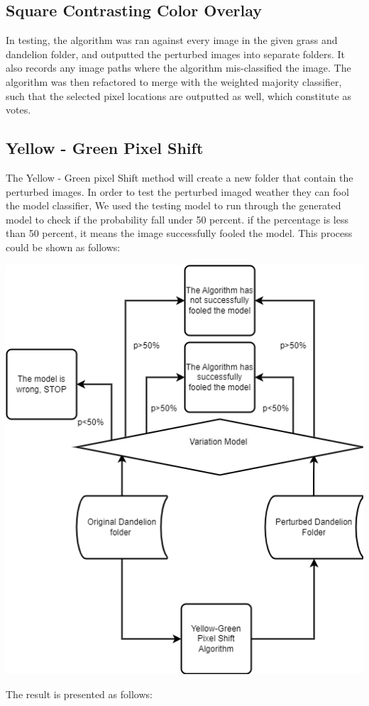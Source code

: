 \documentclass{article}
\begin{document}
\subsection{Square Contrasting Color Overlay}
In testing, the algorithm was ran against every image in the given grass and dandelion folder, and outputted the perturbed images into separate folders. It also records any image paths where the algorithm mis-classified the image. The algorithm was then refactored to merge with the weighted majority classifier, such that the selected pixel locations are outputted as well, which constitute as votes.

\subsection{Yellow - Green Pixel Shift}
\vspace{0.1in}
The Yellow - Green pixel Shift method will create a new folder that contain the perturbed images. In order to test the perturbed imaged weather they can fool the model classifier, We used the testing model to run through the generated model to check if the probability fall under 50 percent. if the percentage is less than 50 percent, it means the image successfully fooled the model. This process could be shown as follows:
\begin{center}
\includegraphics[scale = 0.5]{YGS_1.drawio.png}
\end{center}
The result is presented as follows:
\\
\end{document}
